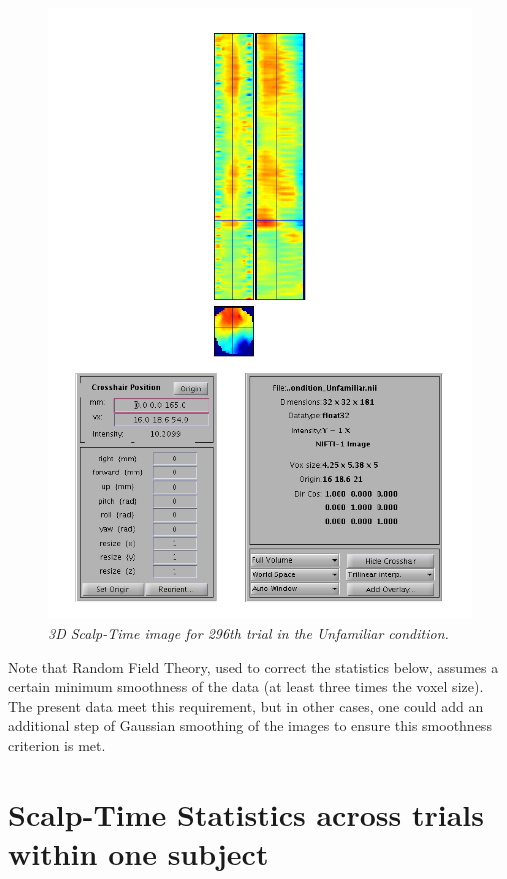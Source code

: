 \begin{figure}
\begin{center}
\includegraphics[width=150mm]{multi/figures/figure5}
\caption{\em 3D Scalp-Time image for 296th trial in the Unfamiliar condition. \label{multi:fig:5}}
\end{center}
\end{figure}


Note that Random Field Theory, used to correct the statistics below, assumes a certain minimum smoothness of the data (at least three times the voxel size). The present data meet this requirement, but in other cases, one could add an additional step of Gaussian smoothing of the images to ensure this smoothness criterion is met.  

\section{Scalp-Time Statistics across trials within one subject}

